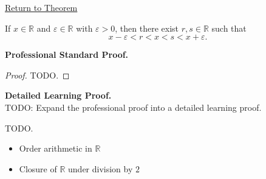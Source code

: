 \newpage
{}
\label{prf:real-upper-lower-perturbation}

\begin{remark*}[Return]
\hyperref[thm:real-upper-lower-perturbation]{Return to Theorem}
\end{remark*}

\begin{theorem*}
If $x\in\mathbb{R}$ and $\varepsilon\in\mathbb{R}$ with $\varepsilon>0$, then
there exist $r,s\in\mathbb{R}$ such that
\[
x-\varepsilon<r<x<s<x+\varepsilon.
\]
\end{theorem*}

\textbf{Professional Standard Proof.}~\\
\begin{proof}
TODO.
\end{proof}

\textbf{Detailed Learning Proof.}~\\
TODO: Expand the professional proof into a detailed learning proof.


\begin{remark*}
TODO.
\end{remark*}

\begin{dependencies}
\begin{itemize}
  \item Order arithmetic in $\mathbb{R}$
  \item Closure of $\mathbb{R}$ under division by $2$
\end{itemize}
\end{dependencies}
